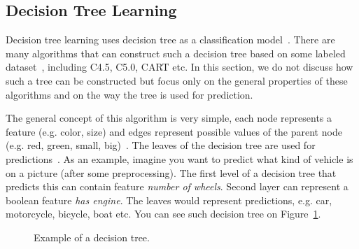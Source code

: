 \subsection{Decision Tree Learning}

Decision tree learning uses decision tree as a classification model~\cite{mitchell1997machine}. There are many algorithms that can construct such a decision tree based on some labeled dataset~\cite{mitchell1997machine}, including C4.5, C5.0, CART etc. In this section, we do not discuss how such a tree can be constructed but focus only on the general properties of these algorithms and on the way the tree is used for prediction.

The general concept of this algorithm is very simple, each node represents a feature (e.g. color, size) and edges represent possible values of the parent node (e.g. red, green, small, big)~\cite{mitchell1997machine}. The leaves of the decision tree are used for predictions~\cite{mitchell1997machine}. As an example, imagine you want to predict what kind of vehicle is on a picture (after some preprocessing). The first level of a decision tree that predicts this can contain feature \textit{number of wheels}. Second layer can represent a boolean feature \textit{has engine}. The leaves would represent predictions, e.g. car, motorcycle, bicycle, boat etc. You can see such decision tree on Figure~\ref{fig:decision.tree.example}.

\begin{figure}[htbp]
    \centering
    \caption{Example of a decision tree.}
    \label{fig:decision.tree.example}
\end{figure}

